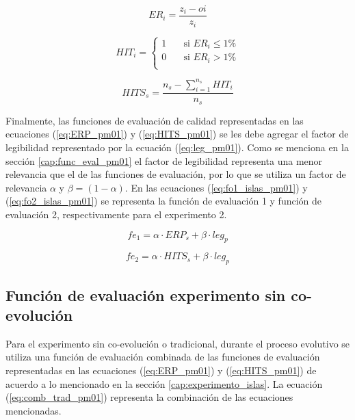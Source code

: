 \begin{equation}
\label{eq:ER_pm01}
	ER_{i} = \frac{z_{i}-o{i}}{z_{i}}
\end{equation}

\begin{equation}
\label{eq:HIT_pm01}
	HIT_{i} = 	\begin{cases}
					1       & \quad \text{si } ER_{i} \leq 1\% \\
					0  		& \quad \text{si } ER_{i} > 1\%	   \\
				\end{cases}
\end{equation}

\begin{equation}
\label{eq:HITS_pm01}
	HITS_{s} = \frac{n_{s} - \sum\limits_{i=1}^{n_{s}} HIT_{i} }{n_{s}}
\end{equation}

Finalmente, las funciones de evaluación de calidad representadas en las ecuaciones (\ref{eq:ERP_pm01}) y (\ref{eq:HITS_pm01}) se les debe agregar el factor de legibilidad representado por la ecuación (\ref{eq:leg_pm01}). Como se menciona en la sección \ref{cap:func_eval_pm01} el factor de legibilidad representa una menor relevancia que el de las funciones de evaluación, por lo que se utiliza un factor de relevancia $\alpha$ y $\beta=(1 - \alpha)$. En las ecuaciones (\ref{eq:fo1_islas_pm01}) y (\ref{eq:fo2_islas_pm01}) se representa la función de evaluación 1 y función de evaluación 2, respectivamente para el experimento 2.

\begin{equation}
\label{eq:fo1_islas_pm01}
	fe_{1} = \alpha\cdot ERP_{s}+ \beta\cdot leg_{p}
\end{equation}

\begin{equation}
\label{eq:fo2_islas_pm01}
	fe_{2} = \alpha\cdot HITS_{s}+ \beta\cdot leg_{p}
\end{equation}

\subsection{Función de evaluación experimento sin co-evolución}
\label{cap:fo_trad}

Para el experimento sin co-evolución o tradicional, durante el proceso evolutivo se utiliza una función de evaluación combinada de las funciones de evaluación representadas en las ecuaciones (\ref{eq:ERP_pm01}) y (\ref{eq:HITS_pm01}) de acuerdo a lo mencionado en la sección \ref{cap:experimento_islas}. La ecuación (\ref{eq:comb_trad_pm01}) representa la combinación de las ecuaciones mencionadas.

